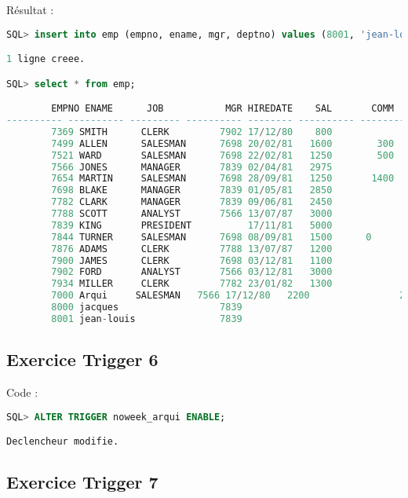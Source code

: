 \documentclass{article}
\begin{document}
Résultat :
\begin{lstlisting}[language=SQL,
    morekeywords={DECLARE, LOOP, TYPE, FOR, IF, IS, OPEN, FETCH, DBMS_OUTPUT, PUT_LINE}]
SQL> insert into emp (empno, ename, mgr, deptno) values (8001, 'jean-louis', 7839, 65);

1 ligne creee.

SQL> select * from emp;

        EMPNO ENAME      JOB	       MGR HIREDATE	   SAL	     COMM     DEPTNO
---------- ---------- --------- ---------- -------- ---------- ---------- ----------
        7369 SMITH      CLERK	      7902 17/12/80	   800			      20
        7499 ALLEN      SALESMAN	  7698 20/02/81	  1600	      300	  30
        7521 WARD       SALESMAN	  7698 22/02/81	  1250	      500	  30
        7566 JONES      MANAGER	      7839 02/04/81	  2975			      20
        7654 MARTIN     SALESMAN	  7698 28/09/81	  1250	     1400	  30
        7698 BLAKE      MANAGER	      7839 01/05/81	  2850			      30
        7782 CLARK      MANAGER	      7839 09/06/81	  2450			      10
        7788 SCOTT      ANALYST	      7566 13/07/87	  3000			      20
        7839 KING       PRESIDENT 	       17/11/81	  5000			      10
        7844 TURNER     SALESMAN	  7698 08/09/81	  1500		0	      30
        7876 ADAMS      CLERK	      7788 13/07/87	  1200			      20
        7900 JAMES      CLERK	      7698 03/12/81	  1100			      30
        7902 FORD       ANALYST	      7566 03/12/81	  3000			      20
        7934 MILLER     CLERK	      7782 23/01/82	  1300			      10
        7000 Arqui     SALESMAN	  7566 17/12/80	  2200			      20
        8000 jacques		          7839					              64
        8001 jean-louis		          7839					              65
\end{lstlisting}


\subsection{Exercice Trigger 6}
Code :
\begin{lstlisting}[language=SQL,
    deletekeywords={char},
    morekeywords={DECLARE, LOOP, TYPE, FOR, IF, IS, OPEN, FETCH, DBMS_OUTPUT, PUT_LINE}]
SQL> ALTER TRIGGER noweek_arqui ENABLE;

Declencheur modifie.    
\end{lstlisting}

\subsection{Exercice Trigger 7}
\end{document}

